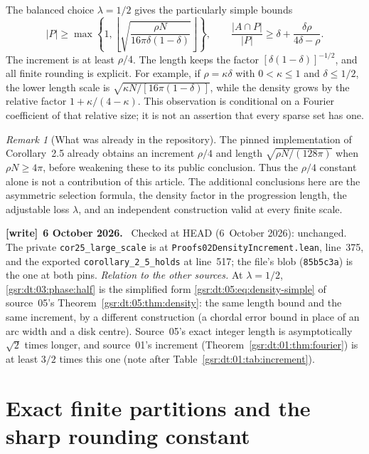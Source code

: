\documentclass[11pt,letterpaper]{article}
\numberwithin{equation}{section}
\theoremstyle{definition}
\theoremstyle{remark}
\newtheorem{remark}[theorem]{Remark}
\newcommand{\1}{\mathbf 1}
\newcommand{\file}[1]{\nolinkurl{#1}}
\newenvironment{writenote}[1][]{\par\smallskip\begingroup\small
 \noindent\textbf{[write]}\if\relax\detokenize{#1}\relax\else~\textbf{#1.}\fi\ }%
 {\par\endgroup\smallskip}
\newcommand{\srctag}[1]{\texorpdfstring{\enspace\textup{[#1]}}{ [#1]}}
\newcommand{\srcnote}[2]{\par\noindent{\small\textit{Source #1, delivered #2.}}\par}
\begin{document}
The balanced choice $\lambda=1/2$ gives the particularly simple bounds
\begin{equation}
 |P|\ge\max\left\{1,
 \left\lfloor\sqrt{\frac{\rho N}{16\pi\delta(1-\delta)}}
 \right\rfloor\right\},\qquad
 \frac{|A\cap P|}{|P|}\ge\delta+\frac{\delta\rho}{4\delta-\rho}.
 \label{gsr:dt:03:phase:half}
\end{equation}
The increment is at least $\rho/4$. The length keeps the factor
$[\delta(1-\delta)]^{-1/2}$, and all finite rounding is explicit.
For example, if $\rho=\kappa\delta$ with $0<\kappa\le1$ and
$\delta\le1/2$, the lower length scale is
$\sqrt{\kappa N/[16\pi(1-\delta)]}$, while the density grows by the
relative factor $1+\kappa/(4-\kappa)$. This observation is conditional
on a Fourier coefficient of that relative size; it is not an assertion
that every sparse set has one.

\begin{remark}[What was already in the repository]\label{gsr:dt:03:rem:repo}
The pinned implementation of Corollary~2.5 already obtains an increment
$\rho/4$ and length $\sqrt{\rho N/(128\pi)}$ when
$\rho N\ge4\pi$, before weakening these to its public conclusion.
Thus the $\rho/4$ constant alone is not a contribution of this article.
The additional conclusions here are the asymmetric selection formula,
the density factor in the progression length, the adjustable loss
$\lambda$, and an independent construction valid at every finite scale.
\end{remark}
\begin{writenote}[6 October 2026]
Checked at HEAD (6~October 2026): unchanged. The private \file{cor25_large_scale} is at \file{Proofs02DensityIncrement.lean}, line~375, and the exported \file{corollary_2_5_holds} at line~517; the file's blob (\texttt{85b5c3a}) is the one at both pins. \emph{Relation to the other sources.} At $\lambda=1/2$, \eqref{gsr:dt:03:phase:half} is the simplified form \eqref{gsr:dt:05:eq:density-simple} of source~05's Theorem~\ref{gsr:dt:05:thm:density}: the same length bound and the same increment, by a different construction (a chordal error bound in place of an arc width and a disk centre). Source~05's exact integer length is asymptotically $\sqrt2$ times longer, and source~01's increment (Theorem~\ref{gsr:dt:01:thm:fourier}) is at least $3/2$ times this one (note after Table~\ref{gsr:dt:01:tab:increment}).
\end{writenote}

\section[{Exact finite partitions and the sharp rounding constant\srctag{05}}]{Exact finite partitions and the sharp rounding constant}\label{gsr:dt:05:sec:d2}
\srcnote{05}{Section 2}
\label{gsr:dt:05:sec:partitions}
\end{document}
